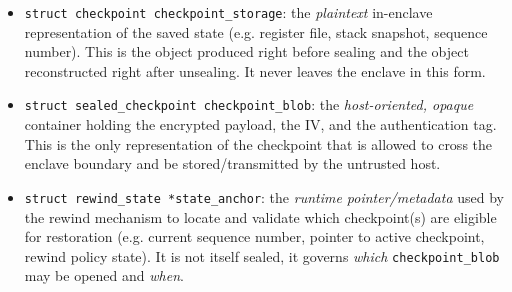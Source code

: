 \documentclass[11pt,a4paper]{report}
\begin{document}
\begin{itemize}
    \item \texttt{struct checkpoint checkpoint\_storage}: the
    \textit{plaintext} in-enclave representation of the saved state
    (e.g. register file, stack snapshot, sequence number). This is the
    object produced right before sealing and the object reconstructed
    right after unsealing. It never leaves the enclave in this form.

    \item \texttt{struct sealed\_checkpoint checkpoint\_blob}: the
    \textit{host-oriented, opaque} container holding the encrypted payload,
    the IV, and the authentication tag. This is the only representation
    of the checkpoint that is allowed to cross the enclave boundary and
    be stored/transmitted by the untrusted host.

    \item \texttt{struct rewind\_state *state\_anchor}: the
    \textit{runtime pointer/metadata} used by the rewind mechanism to
    locate and validate which checkpoint(s) are eligible for restoration
    (e.g. current sequence number, pointer to active checkpoint, rewind
    policy state). It is not itself sealed, it governs \textit{which}
    \texttt{checkpoint\_blob} may be opened and \textit{when}.
\end{itemize}
\end{document}

